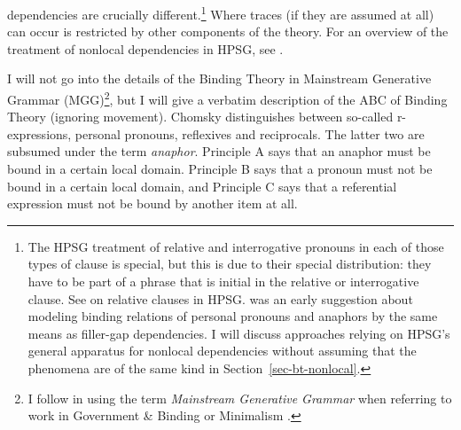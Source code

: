 \documentclass[output=paper,biblatex,babelshorthands,newtxmath,draftmode,colorlinks,citecolor=brown]{langscibook}
\begin{document}
dependencies are crucially different.\footnote{\label{binding-fn-percolation-of-indices}%
The HPSG treatment of relative and interrogative pronouns in each of those types of clause is special, but this
is due to their special distribution: they have to be part of a phrase that is initial in the
relative or interrogative clause. 
See  on relative
clauses in HPSG. %
 was an early suggestion about modeling binding relations of personal pronouns and anaphors by
the same means as filler-gap dependencies. I will discuss approaches relying on HPSG's general apparatus
for nonlocal dependencies without assuming that the phenomena are of the same kind in Section~\ref{sec-bt-nonlocal}. 
} Where traces (if they are assumed at all) can occur
is restricted by other components of the theory. For an overview of the treatment of nonlocal
dependencies in HPSG, see .

I will not go into the details of the Binding Theory in Mainstream Generative Grammar
(MGG)\footnote{
I follow \citet[]{CJ2005a} in using the term \emph{Mainstream Generative Grammar} when
referring to work in Government \& Binding\indexgb \citep{Chomsky81a} or Minimalism \citep{Chomsky95a-u}.}, but I will
give a verbatim description of the ABC of Binding Theory (ignoring movement). Chomsky distinguishes between
so-called r-expressions, personal pronouns, reflexives and reciprocals. The latter two are subsumed under the term \emph{anaphor}. 
Principle A says that an anaphor must be bound in a certain local domain. Principle B says that a
pronoun must not be bound in a certain local domain, and Principle C says that a referential
expression must not be bound by another item at all.
\end{document}
